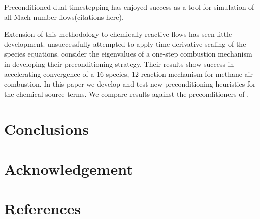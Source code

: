 \documentclass[final,3p,times,twocolumn]{elsarticle}
\begin{document}
Preconditioned dual timestepping has enjoyed success as a tool for
simulation of all-Mach number flows(citations here).

Extension of this methodology to chemically reactive flows has seen little
development. \citet{Venkateswaran1995} unsuccessfully attempted to apply
time-derivative scaling of the species equations. \citet{Sankaran2007} consider
the eigenvalues of a one-step combustion mechanism in developing their
preconditioning strategy. Their results show success in accelerating
convergence of a 16-species, 12-reaction mechanism for methane-air combustion.
In this paper we develop and test new preconditioning heuristics for the
chemical source terms. We compare results against the preconditioners of
\citet{Venkateswaran1995, Sankaran2007}.

\section{Conclusions}
\blindtext
\blindtext

\section{Acknowledgement}
\blindtext

\section{References}


\end{document}
